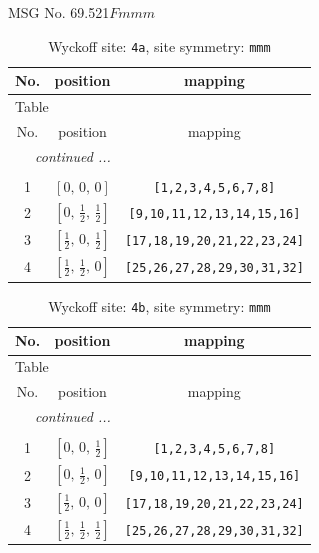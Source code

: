 \documentclass[fleqn,8pt]{jsarticle}
\begin{document}
\setcounter{MaxMatrixCols}{32}

\renewcommand{\tablename}{Table~}
\renewcommand{\figurename}{Figure~}
\begin{center}
\LARGE
MSG No. 69.521\quad$Fmmm$
\end{center}
\renewcommand{\arraystretch}{1.2}
\begin{longtable}{ccc}
\caption{Wyckoff site: {\tt 4a}, site symmetry: {\tt mmm}}
 \\
 \hline \hline
No. & position & mapping \\ \hline \endfirsthead

\multicolumn{2}{l}{\tablename\ \thetable{}} \\
 \hline \hline
No. & position & mapping \\ \hline \endhead

 \hline \hline
\multicolumn{2}{r}{\footnotesize\it continued ...} \\ \endfoot

 \hline \hline
\multicolumn{2}{r}{} \\ \endlastfoot

1 & $\left[ 0,\, 0,\, 0 \right]$ & {\tt [1,2,3,4,5,6,7,8]} \\ \hline
2 & $\left[ 0,\, \frac{1}{2},\, \frac{1}{2} \right]$ & {\tt [9,10,11,12,13,14,15,16]} \\ \hline
3 & $\left[ \frac{1}{2},\, 0,\, \frac{1}{2} \right]$ & {\tt [17,18,19,20,21,22,23,24]} \\ \hline
4 & $\left[ \frac{1}{2},\, \frac{1}{2},\, 0 \right]$ & {\tt [25,26,27,28,29,30,31,32]} \\
\end{longtable}
\renewcommand{\arraystretch}{1.2}
\begin{longtable}{ccc}
\caption{Wyckoff site: {\tt 4b}, site symmetry: {\tt mmm}}
 \\
 \hline \hline
No. & position & mapping \\ \hline \endfirsthead

\multicolumn{2}{l}{\tablename\ \thetable{}} \\
 \hline \hline
No. & position & mapping \\ \hline \endhead

 \hline \hline
\multicolumn{2}{r}{\footnotesize\it continued ...} \\ \endfoot

 \hline \hline
\multicolumn{2}{r}{} \\ \endlastfoot

1 & $\left[ 0,\, 0,\, \frac{1}{2} \right]$ & {\tt [1,2,3,4,5,6,7,8]} \\ \hline
2 & $\left[ 0,\, \frac{1}{2},\, 0 \right]$ & {\tt [9,10,11,12,13,14,15,16]} \\ \hline
3 & $\left[ \frac{1}{2},\, 0,\, 0 \right]$ & {\tt [17,18,19,20,21,22,23,24]} \\ \hline
4 & $\left[ \frac{1}{2},\, \frac{1}{2},\, \frac{1}{2} \right]$ & {\tt [25,26,27,28,29,30,31,32]} \\
\end{longtable}
\end{document}
